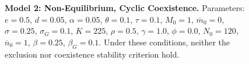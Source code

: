 \documentclass{amsart}
\theoremstyle{definition}
\theoremstyle{remark}
\numberwithin{equation}{section}
\begin{document}
\begin{centering}
\begin{figure}[h]
{			%
		}
		\caption{\footnotesize {\bf Model 2: Non-Equilibrium, Cyclic Coexistence.} Parameters: $e = 0.5$, $d = 0.05$, $\alpha = 0.05$, $\theta = 0.1$, $\tau = 0.1$, $M_0 = 1$, $\overline{m}_0 = 0$, $\sigma = 0.25$, $\sigma_G = 0.1$, $K = 225$, $\rho = 0.5$, $\gamma = 1.0$, $\phi = 0.0$, $N_0 = 120$, $\overline{n}_0 = 1$, $\beta = 0.25$, $\beta_G = 0.1$.  Under these conditions, neither the exclusion nor coexistence stability criterion hold.}
		\label{fig:variable_growth_stable_cycles}
	\end{figure}
	\begin{figure}[h]
\end{figure}
\end{centering}
\end{document}
